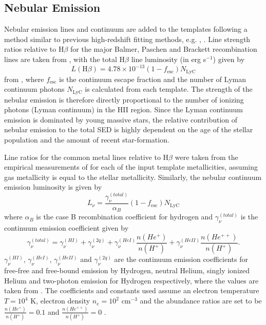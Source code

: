 \subsection{Nebular Emission}\label{subsection:nebular}
Nebular emission lines and continuum are added to the templates following a method similar to previous high-redshift fitting methods, e.g.  \citet{Ono:2010ed,2010A&A...515A..73S,2011MNRAS.418.2074M}, \citet{Salmon:2014tm}. Line strength ratios relative to H$\beta$ for the major Balmer, Paschen and Brackett recombination lines are taken from \cite{Osterbrock:2006ul}, with the total H$\beta$ line luminosity (in erg s$^{-1}$) given by
\begin{equation}
L(\text{H}\beta) = 4.78 \times10^{-13} (1-f_{\text{esc}}) N_{\text{LyC}}
\end{equation}
from \citet{1995A&A...303...41K}, where $f_{\text{esc}}$ is the continuum escape fraction and the number of Lyman continuum photons $N_{\text{LyC}}$ is calculated from each template. The strength of the nebular emission is therefore directly proportional to the number of ionizing photons (Lyman continuum) in the HII region. Since the Lyman continuum emission is dominated by young massive stars, the relative contribution of nebular emission to the total SED is highly dependent on the age of the stellar population and the amount of recent star-formation.  
 
Line ratios for the common metal lines relative to H$\beta$ were taken from the empirical measurements of \cite{Anders:2003ci} for each of the input template metallicities, assuming gas metallicity is equal to the stellar metallicity.
Similarly, the nebular continuum emission luminosity is given by
\begin{equation}
\label{eq:continuum}
L_{\nu} = \frac{\gamma^{(total)}_{\nu}} {\alpha_{B}}(1-f_{\text{esc}}) N_{\text{LyC}}
\end{equation}
where $\alpha_{B}$ is the case B recombination coefficient for hydrogen and $\gamma^{(total)}_{\nu}$ is the continuum emission coefficient given by
\begin{equation}\label{eq:cont_sep}
\gamma^{(total)}_{\nu} = \gamma^{(HI)}_{\nu} + \gamma^{(2q)}_{\nu} +  \gamma^{(HeI)}_{\nu}\frac{n(He^{+})} {n(H^{+})} + \gamma^{(HeII)}_{\nu}\frac{n(He^{++})} {n(H^{+})}
.\end{equation}
$\gamma^{(HI)}_{\nu}$, $\gamma^{(HeI)}_{\nu}$, $\gamma^{(HeII)}_{\nu}$ and $\gamma^{(2q)}_{\nu}$ are the continuum emission coefficients for free-free and free-bound emission by Hydrogen, neutral Helium, singly ionized Helium and two-photon emission for Hydrogen respectively, where the values are taken from \cite{Osterbrock:2006ul}. The coefficients and constants used assume an electron temperature $T=10^4$ K, electron density $n_{e}=10^2$ cm$^{-3}$ and the abundance ratios are set to be $\frac{n(He^{+})} {n(H^{+})} = 0.1$ and $\frac{n(He^{++})} {n(H^{+})} = 0$ \citep{1995A&A...303...41K}.

